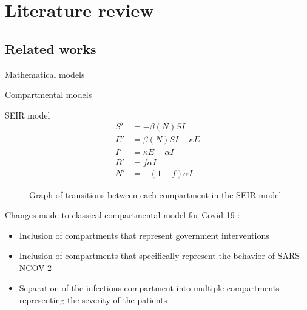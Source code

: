 \section{Literature review}

\subsection{Related works}

\begin{frame}[allowframebreaks]{Mathematical models}

    Compartmental models \cite{brauerCompartmentalModelsEpidemiology2008}

    \begin{block}{\gls{SEIR} model}
        \begin{equation*}
            \begin{aligned}
                S' &= - \beta(N)SI \\
                E' &= \beta(N)SI - \kappa E \\
                I' &= \kappa E - \alpha I \\
                R' &= f \alpha I \\
                N' &= - (1 - f) \alpha I
            \end{aligned}
        \end{equation*}
    \end{block}

    \framebreak

    \begin{figure}
        \centering
        \caption{Graph of transitions between each compartment in the SEIR model}
        \label{fig:seir-model-transition-graph}
    \end{figure}

    \framebreak

    Changes made to classical compartmental model for Covid-19 \cite{zhaoModelingEpidemicDynamics2020,heSEIRModelingCOVID192020,ndairouMathematicalModelingCOVID192020,bastosModelingForecastingEarly2020,sarkarModelingForecastingCOVID192020}:
    \begin{itemize}
        \item Inclusion of compartments that represent government interventions
        \item Inclusion of compartments that specifically represent the behavior of SARS-NCOV-2
        \item Separation of the infectious compartment into multiple compartments representing the severity of the patients
    \end{itemize}


\end{frame}
